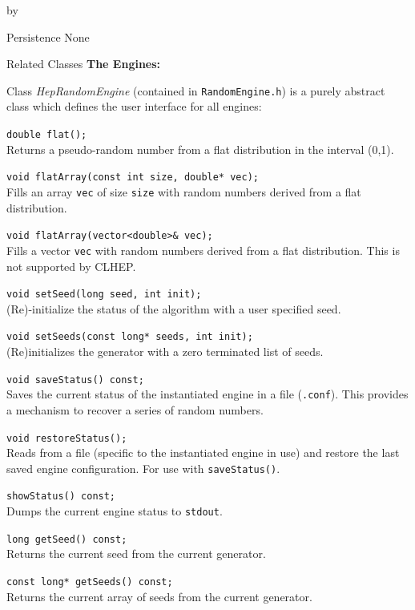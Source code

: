 \documentclass[twoside]{article}
\newcommand{\comp}[1]{\texttt{#1}}%
\newcommand{\entrylabel}[1]{\mbox{\textbf{{#1}}}\hfil}%
\newenvironment{entry}
{\begin{list}{}%
    {\renewcommand{\makelabel}{\entrylabel}%
     \setlength{\labelwidth}{90pt}%
     \setlength{\leftmargin}{\labelwidth}
     \advance\leftmargin by \labelsep%
      }%
    }%
  {\end{list}}
\newcommand{\Entrylabel}[1]%
{\raisebox{0pt}[1ex][0pt]{\makebox[\labelwidth][l]%
    {\parbox[t]{\labelwidth}{\hspace{0pt}\textbf{{#1}}}}}}
\newenvironment{Entry}%
{\renewcommand{\entrylabel}{\Entrylabel}\begin{entry}}%
  {\end{entry}}
\begin{document}
\begin{description}
\begin{Entry}
\item[Persistence]
    None

\item[Related Classes]
  {\bf The Engines:}
  
    Class {\em HepRandomEngine} (contained in \comp{RandomEngine.h}) is a purely
    abstract class which defines the user interface for all engines:

     \verb+double flat();+\\
     Returns a pseudo-random number from a flat distribution
     in the interval (0,1).

     \verb+void flatArray(const int size, double* vec);+\\
     Fills an array \comp{vec} of size \comp{size} with random
     numbers derived from a flat distribution.

     \verb+void flatArray(vector<double>& vec);+\\
     Fills a vector \comp{vec} with random
     numbers derived from a flat distribution.  This is
     not supported by CLHEP.
     
     \verb+void setSeed(long seed, int init);+\\
     (Re)-initialize the status of the algorithm with a user specified
     seed.
     
     \verb+void setSeeds(const long* seeds, int init);+\\
     (Re)initializes the generator with a zero terminated list of seeds.
     
     \verb+void saveStatus() const;+\\
     Saves the current status of the instantiated engine
     in a file (\comp{.conf}).  This provides a mechanism
     to recover a series of random numbers.

     \verb+void restoreStatus();+ \\
     Reads from a file (specific to the instantiated engine in use)
     and restore the last saved engine configuration.  For use with
     \comp{saveStatus()}.

     \verb+showStatus() const;+\\
     Dumps the current engine status to \comp{stdout}.

     \verb+long getSeed() const;+\\
     Returns the current seed from the current generator.

     \verb+const long* getSeeds() const;+\\
     Returns the current array of seeds from the current generator.


\end{Entry}
\end{description}
\end{document}
